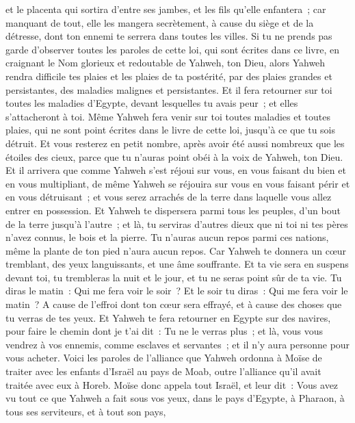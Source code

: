 \begin{multicols}{2}
et le placenta qui sortira d'entre ses jambes, et les fils qu'elle enfantera~; car manquant de tout, elle les mangera secrètement, à cause du siège et de la détresse, dont ton ennemi te serrera dans toutes les villes.
Si tu ne prends pas garde d'observer toutes les paroles de cette loi, qui sont écrites dans ce livre, en craignant le Nom glorieux et redoutable de Yahweh, ton Dieu,
alors Yahweh rendra difficile tes plaies et les plaies de ta postérité, par des plaies grandes et persistantes, des maladies malignes et persistantes. 
Et il fera retourner sur toi toutes les maladies d'Egypte, devant lesquelles tu avais peur~; et elles s'attacheront à toi.
Même Yahweh fera venir sur toi toutes maladies et toutes plaies, qui ne sont point écrites dans le livre de cette loi, jusqu'à ce que tu sois détruit.
Et vous resterez en petit nombre, après avoir été aussi nombreux que les étoiles des cieux, parce que tu n'auras point obéi à la voix de Yahweh, ton Dieu.
Et il arrivera que comme Yahweh s'est réjoui sur vous, en vous faisant du bien et en vous multipliant, de même Yahweh se réjouira sur vous en vous faisant périr et en vous détruisant~; et vous serez arrachés de la terre dans laquelle vous allez entrer en possession.
Et Yahweh te dispersera parmi tous les peuples, d'un bout de la terre jusqu'à l'autre~; et là, tu serviras d'autres dieux que ni toi ni tes pères n'avez connus, le bois et la pierre.
Tu n'auras aucun repos parmi ces nations, même la plante de ton pied n'aura aucun repos. Car Yahweh te donnera un cœur tremblant, des yeux languissants, et une âme souffrante.
Et ta vie sera en suspens devant toi, tu trembleras la nuit et le jour, et tu ne seras point sûr de ta vie.
Tu diras le matin~: Qui me fera voir le soir~? Et le soir tu diras~: Qui me fera voir le matin~? A cause de l'effroi dont ton cœur sera effrayé, et à cause des choses que tu verras de tes yeux.
Et Yahweh te fera retourner en Egypte sur des navires, pour faire le chemin dont je t'ai dit~: Tu ne le verras plus~; et là, vous vous vendrez à vos ennemis, comme esclaves et servantes~; et il n'y aura personne pour vous acheter.
\VerseOne{}Voici les paroles de l'alliance que Yahweh ordonna à Moïse de traiter avec les enfants d'Israël au pays de Moab, outre l'alliance qu'il avait traitée avec eux à Horeb.
Moïse donc appela tout Israël, et leur dit~: Vous avez vu tout ce que Yahweh a fait sous vos yeux, dans le pays d'Egypte, à Pharaon, à tous ses serviteurs, et à tout son pays,

\end{multicols}
